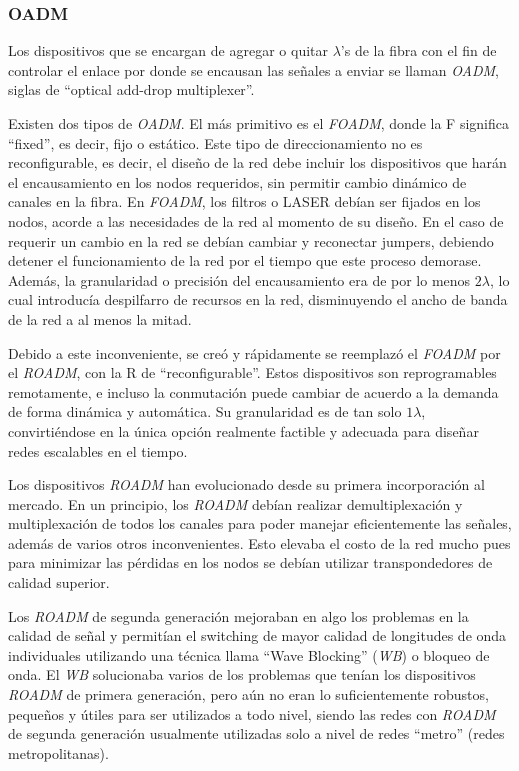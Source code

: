 \subsubsection{OADM}
\label{sec:oadm}

Los dispositivos que se encargan de agregar o quitar $\lambda$'s de la
fibra con el fin de controlar el enlace por donde se encausan las
señales a enviar se llaman \emph{OADM}, siglas de ``optical add-drop
multiplexer''.

Existen dos tipos de \emph{OADM}. El más primitivo es el \emph{FOADM},
donde la F significa ``fixed'', es decir, fijo o estático. Este tipo
de direccionamiento no es reconfigurable, es decir, el diseño de la
red debe incluir los dispositivos que harán el encausamiento en los
nodos requeridos, sin permitir cambio dinámico de canales en la
fibra. En \emph{FOADM}, los filtros o LASER debían ser fijados en los
nodos, acorde a las necesidades de la red al momento de su diseño. En
el caso de requerir un cambio en la red se debían cambiar y reconectar
jumpers, debiendo detener el funcionamiento de la red por el tiempo
que este proceso demorase. Además, la granularidad o precisión del
encausamiento era de por lo menos $2\lambda$, lo cual introducía
despilfarro de recursos en la red, disminuyendo el ancho de banda de
la red a al menos la mitad.

Debido a este inconveniente, se creó y rápidamente se reemplazó el
\emph{FOADM} por el \emph{ROADM}, con la R de
``reconfigurable''. Estos dispositivos son reprogramables remotamente,
e incluso la conmutación puede cambiar de acuerdo a la demanda de
forma dinámica y automática. Su granularidad es de tan solo
$1\lambda$, convirtiéndose en la única opción realmente factible y
adecuada para diseñar redes escalables en el tiempo.

Los dispositivos \emph{ROADM} han evolucionado desde su primera
incorporación al mercado. En un principio, los \emph{ROADM} debían
realizar demultiplexación y multiplexación de todos los canales para
poder manejar eficientemente las señales, además de varios otros
inconvenientes. Esto elevaba el costo de la red mucho pues para
minimizar las pérdidas en los nodos se debían utilizar transpondedores
de calidad superior.

Los \emph{ROADM} de segunda generación mejoraban en algo los problemas
en la calidad de señal y permitían el switching de mayor calidad de
longitudes de onda individuales utilizando una técnica llama ``Wave
Blocking'' (\emph{WB}) o bloqueo de onda. El \emph{WB} solucionaba
varios de los problemas que tenían los dispositivos \emph{ROADM} de
primera generación, pero aún no eran lo suficientemente robustos,
pequeños y útiles para ser utilizados a todo nivel, siendo las redes
con \emph{ROADM} de segunda generación usualmente utilizadas solo a
nivel de redes ``metro'' (redes metropolitanas).

